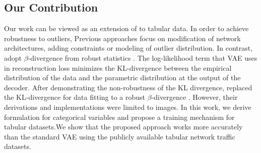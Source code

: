 \documentclass{article}
\theoremstyle{plain}
\theoremstyle{definition}
\begin{document}
\subsection{Our Contribution}
Our work can be viewed as an extension of \citet{akrami2019robust} to tabular data. In order to achieve robustness to outliers, Previous approaches
focus on modification of network architectures, adding constraints or modeling of outlier distribution\cite{zhai2017robust,eduardo2019robust}. In contrast,  \citet{akrami2019robust}  adopt $\beta$-divergence from robust statistics \cite{futami2017variational}. The log-likelihood term that VAE uses in reconstruction loss minimizes the KL-divergence between the empirical distribution of the data and the parametric distribution at the output of the decoder. After demonstrating the non-robustness of the KL divergence, \citet{akrami2019robust} replaced the KL-divergence for data fitting to a robust $\beta$-divergence \cite{basu1998robust}. However, their derivations and implementations were limited to images. In this work, we derive formulation for categorical variables and propose a training mechanism for tabular datasets.We show that the proposed approach works more accurately than the standard VAE using the publicly available tabular network traffic datasets.

\end{document}

